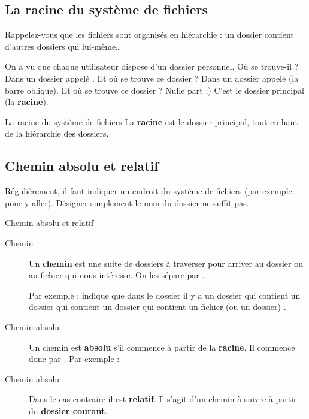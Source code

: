 \documentclass[a4paper,11pt]{style-esi/td}
\begin{document}
	\subsection{La racine du système de fichiers}

		Rappelez-vous que les fichiers sont organisés en hiérarchie :
		un dossier contient d'autres dossiers qui lui-même\dots

		On a vu que chaque utilisateur dispose d'un dossier personnel. 
		Où se trouve-il ? Dans un dossier appelé . 
		Et où se trouve ce dossier  ? 
		Dans un dossier appelé \og{}\samp{/}\fg{} (la barre oblique). 
		Et où se trouve ce dossier \og{}\samp{/}\fg{} ? Nulle part ;) 
		C'est le dossier principal (la \textbf{racine}).

		\begin{theorie}{La racine du système de fichiers}
			La \textbf{racine} est le dossier principal, 
			tout en haut de la hiérarchie des dossiers.
		\end{theorie}

	\subsection{Chemin absolu et relatif}

		
		\bigskip
		Régulièrement, il faut indiquer un endroit du système de fichiers 
		(par exemple pour y aller). 
		Désigner simplement le nom du dossier ne suffit pas.  

		\begin{theorie}{Chemin absolu et relatif}
			\begin{description}
			\item[Chemin]
				Un \textbf{chemin} est une suite de dossiers à traverser 
				pour arriver au dossier ou au fichier qui nous intéresse.
				On les sépare par \og{}\samp{/}\fg{}.

				Par exemple : 
				indique que dans le dossier 
				il y a un dossier 
				qui contient un dossier  
				qui contient un dossier  
				qui contient un fichier (ou un dossier) .
			\item[Chemin absolu]
				Un chemin est \textbf{absolu} 
				s'il commence à partir de la \textbf{racine}.
				Il commence donc par \og{}\samp{/}\fg{}.
				Par exemple : 
			\item[Chemin absolu]
				Dans le cas contraire il est \textbf{relatif}.
				Il s'agit d'un chemin à suivre à partir du \textbf{dossier courant}.
			\end{description}
		\end{theorie}
\end{document}

